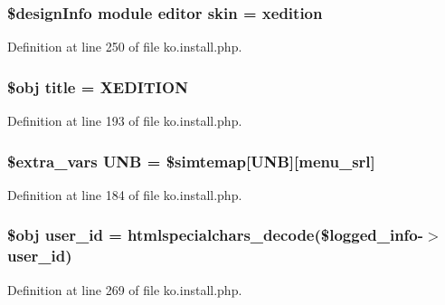 \subsubsection[{skin}]{\setlength{\rightskip}{0pt plus 5cm}\$design\+Info {\bf module} {\bf editor} skin = \textquotesingle{}xedition\textquotesingle{}}\label{ko_8install_8php_ab0f2b49fdb57754496b34f6b880cdeaf}


Definition at line 250 of file ko.\+install.\+php.

\hypertarget{ko_8install_8php_a5b072c5fd1d2228c6ba5cee13cd142e3}{}
\subsubsection[{title}]{\setlength{\rightskip}{0pt plus 5cm}\$obj title = \textquotesingle{}X\+E\+D\+I\+T\+I\+O\+N\textquotesingle{}}\label{ko_8install_8php_a5b072c5fd1d2228c6ba5cee13cd142e3}


Definition at line 193 of file ko.\+install.\+php.

\hypertarget{ko_8install_8php_abc0cb1f57d83d4a106f4495c30e0df52}{}
\subsubsection[{U\+N\+B}]{\setlength{\rightskip}{0pt plus 5cm}\${\bf extra\+\_\+vars} U\+N\+B = \$simtemap\mbox{[}\textquotesingle{}U\+N\+B\textquotesingle{}\mbox{]}\mbox{[}\textquotesingle{}menu\+\_\+srl\textquotesingle{}\mbox{]}}\label{ko_8install_8php_abc0cb1f57d83d4a106f4495c30e0df52}


Definition at line 184 of file ko.\+install.\+php.

\hypertarget{ko_8install_8php_a74f1a394389d774e5b4cd5d1d15413f7}{}
\subsubsection[{user\+\_\+id}]{\setlength{\rightskip}{0pt plus 5cm}\$obj user\+\_\+id = htmlspecialchars\+\_\+decode(\$logged\+\_\+info-\/$>$user\+\_\+id)}\label{ko_8install_8php_a74f1a394389d774e5b4cd5d1d15413f7}


Definition at line 269 of file ko.\+install.\+php.

